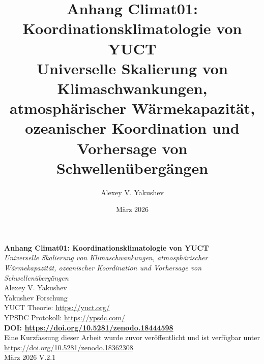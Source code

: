 \documentclass[12pt,a4paper]{article}
\title{Anhang Climat01: Koordinationsklimatologie von YUCT\\
	\large Universelle Skalierung von Klimaschwankungen, atmosphärischer Wärmekapazität, ozeanischer Koordination und Vorhersage von Schwellenübergängen}
\author{Alexey V. Yakushev}
\date{März 2026}
\begin{document}
	\sloppy
	
	\begin{titlepage}
		\centering
		\vspace*{1cm}
		\Huge\textbf{Anhang Climat01: Koordinationsklimatologie von YUCT}\\[0.5cm]
		\large\textit{Universelle Skalierung von Klimaschwankungen, atmosphärischer Wärmekapazität, ozeanischer Koordination und Vorhersage von Schwellenübergängen}\\[2cm]
		
		\Large Alexey V. Yakushev\\[0.3cm]
		\large Yakushev Forschung\\
		YUCT Theorie: \url{https://yuct.org/}\\
		YPSDC Protokoll: \url{https://ypsdc.com/}\\[1cm]
		
		\textbf{DOI: \url{https://doi.org/10.5281/zenodo.18444598}}\\[0.5cm]
		
		Eine Kurzfassung dieser Arbeit wurde zuvor veröffentlicht und ist verfügbar unter\\
		\url{https://doi.org/10.5281/zenodo.18362308}\\[0.5cm]
		März 2026 \quad V.2.1\\[2cm]
		

\end{titlepage}
\end{document}
